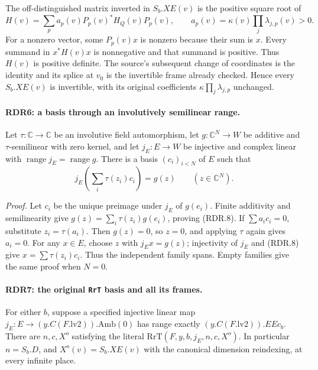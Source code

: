 The off-distinguished matrix inverted in \(S_b.XE(v)\) is the
positive square root of
\[
       H(v)=\sum_p a_p(v)P_p(v)^*H_Q(v)P_p(v),\qquad
       a_p(v)=\kappa(v)\prod_j\lambda_{j,p}(v)>0.             \tag{RDR.7}
\]
For a nonzero vector, some \(P_p(v)x\) is nonzero because
their sum is \(x\).  Every summand in \(x^*H(v)x\) is
nonnegative and that summand is positive.  Thus \(H(v)\)
is positive definite.  The source's subsequent change of
coordinates is the identity and its splice at \(v_0\)
is the invertible frame already checked.  Hence every
\(S_b.XE(v)\) is invertible, with its original coefficients
\(\kappa\prod_j\lambda_{j,p}\) unchanged.

\paragraph{RDR6: a basis through an involutively semilinear range.}
\label{claim:RDR6}
Let \(\tau:\mathbb C\to\mathbb C\) be an involutive field
automorphism, let \(g:\mathbb C^N\to W\) be additive and
\(\tau\)-semilinear with zero kernel, and let
\(j_E:E\to W\) be injective and complex linear with
\(\operatorname{range}j_E=\operatorname{range}g\).
There is a basis \((c_i)_{i<N}\) of \(E\) such that
\[
                  j_E\left(\sum_i\tau(z_i)c_i\right)=g(z)
                         \qquad(z\in\mathbb C^N).          \tag{RDR.8}
\]

\emph{Proof.}
Let \(c_i\) be the unique preimage under \(j_E\) of
\(g(e_i)\).  Finite additivity and semilinearity give
\(g(z)=\sum_i\tau(z_i)g(e_i)\), proving (RDR.8).
If \(\sum a_ic_i=0\), substitute \(z_i=\tau(a_i)\).
Then \(g(z)=0\), so \(z=0\), and applying \(\tau\)
again gives \(a_i=0\).  For any \(x\in E\), choose \(z\)
with \(j_Ex=g(z)\); injectivity of \(j_E\) and (RDR.8)
give \(x=\sum\tau(z_i)c_i\).  Thus the independent family
spans.  Empty families give the same proof when \(N=0\).

\paragraph{RDR7: the original \texttt{RrT} basis and all its frames.}
\label{claim:RDR7}
For either \(b\), suppose a specified injective linear map
\(j_E:E\to(y.C(F.\mathrm{lv2})).\mathrm{Amb}(0)\) has range
exactly \((y.C(F.\mathrm{lv2})).EEc_b\).  There are
\(n,c,X^o\) satisfying the literal \(\mathrm{RrT}(F,y,b,j_E,n,c,X^o)\).
In particular \(n=S_b.D\), and \(X^o(v)=S_b.XE(v)\)
with the canonical dimension reindexing, at every infinite place.

